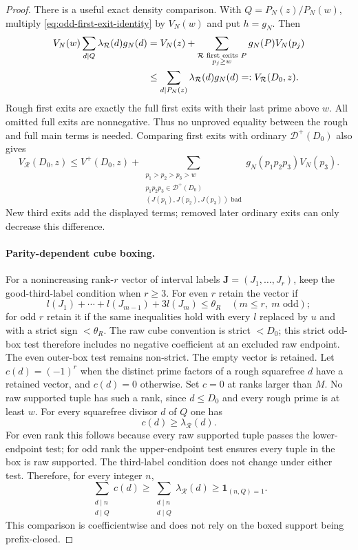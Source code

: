 \documentclass[11pt]{article}
\begin{document}
\begin{proof}
There is a useful exact density comparison. With
$Q=P_N(z)/P_N(w)$, multiply \eqref{eq:odd-first-exit-identity}
by $V_N(w)$ and put $h=g_N$. Then
\begin{align}
 V_N(w)\sum_{d\mid Q}\lambda_{\mathcal R}(d)g_N(d)
 &=V_N(z)+\sum_{\substack{\mathcal R\text{ first exits }P\\p_j\ge w}}
                  g_N(P)V_N(p_j)\notag\\
 &\le\sum_{d\mid P_N(z)}\lambda_{\mathcal R}(d)g_N(d)
        =:V_{\mathcal R}(D_0,z).\label{eq:rough-density-one-sided}
\end{align}
Rough first exits are exactly the full first exits with their last
prime above $w$. All omitted full exits are nonnegative. Thus no
unproved equality between the rough and full main terms is needed.
Comparing first exits with ordinary $\mathcal D^+(D_0)$ also gives
\begin{equation}\label{eq:raw-third-budget}
 V_{\mathcal R}(D_0,z)\le V^+(D_0,z)+
 \sum_{\substack{p_1>p_2>p_3>w\\p_1p_2p_3\in\mathcal D^+(D_0)\\
                         (J(p_1),J(p_2),J(p_3))\text{ bad}}}
                    g_N(p_1p_2p_3)V_N(p_3).
\end{equation}
New third exits add the displayed terms; removed later ordinary exits
can only decrease this difference.

\paragraph{Parity-dependent cube boxing.}
For a nonincreasing rank-$r$ vector of interval labels
$\boldsymbol J=(J_1,\ldots,J_r)$, keep the good-third-label condition
when $r\ge3$. For even $r$ retain the vector if
\[
 l(J_1)+\cdots+l(J_{m-1})+3l(J_m)\le\theta_R
                      \quad(m\le r,\ m\text{ odd});
\]
for odd $r$ retain it if the same inequalities hold with every $l$
replaced by $u$ and with a strict sign $<\theta_R$.
The raw cube convention is strict $<D_0$; this strict odd-box test
therefore includes no negative coefficient at an excluded raw endpoint.
The even outer-box test remains non-strict. The empty vector is retained.
Let $c(d)=(-1)^r$ when the distinct prime factors of a rough squarefree
$d$ have a retained vector, and $c(d)=0$ otherwise. Set $c=0$ at ranks
larger than $M$. No raw supported tuple has such a rank, since
$d\le D_0$ and every rough prime is at least $w$.
For every squarefree divisor $d$ of $Q$ one has
\[
 c(d)\ge\lambda_{\mathcal R}(d).
\]
For even rank this follows because every raw supported tuple passes
the lower-endpoint test; for odd rank the upper-endpoint test ensures
every tuple in the box is raw supported. The third-label condition
does not change under either test. Therefore, for every integer $n$,
\begin{equation}\label{eq:rough-box-pointwise}
 \sum_{\substack{d\mid n\\d\mid Q}}c(d)
 \ge\sum_{\substack{d\mid n\\d\mid Q}}\lambda_{\mathcal R}(d)
 \ge\mathbf1_{(n,Q)=1}.
\end{equation}
This comparison is coefficientwise and does not rely on the boxed
support being prefix-closed.


\end{proof}
\end{document}
